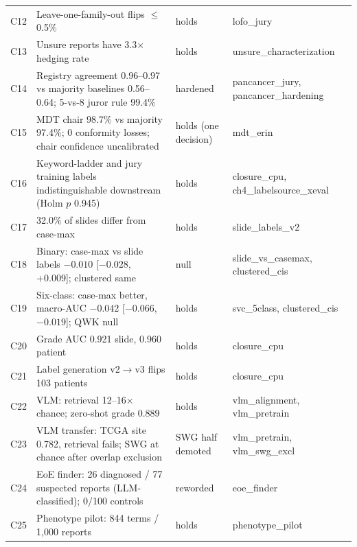 \begin{small}
\begin{longtable}{@{}p{0.9cm}p{8.6cm}p{2.2cm}p{3.3cm}@{}}
C12 & Leave-one-family-out flips $\le$0.5\% & holds & lofo\_jury \\
C13 & Unsure reports have 3.3$\times$ hedging rate & holds & unsure\_characterization \\
C14 & Registry agreement 0.96--0.97 vs majority baselines 0.56--0.64; 5-vs-8 juror rule 99.4\% & hardened & pancancer\_jury, pancancer\_hardening \\
C15 & MDT chair 98.7\% vs majority 97.4\%; 0 conformity losses; chair confidence uncalibrated & holds (one decision) & mdt\_erin \\
C16 & Keyword-ladder and jury training labels indistinguishable downstream (Holm $p$ 0.945) & holds & closure\_cpu, ch4\_labelsource\_xeval \\
C17 & 32.0\% of slides differ from case-max & holds & slide\_labels\_v2 \\
C18 & Binary: case-max vs slide labels $-0.010$ [$-0.028$, +0.009]; clustered same & null & slide\_vs\_casemax, clustered\_cis \\
C19 & Six-class: case-max better, macro-AUC $-0.042$ [$-0.066$, $-0.019$]; QWK null & holds & svc\_5class, clustered\_cis \\
C20 & Grade AUC 0.921 slide, 0.960 patient & holds & closure\_cpu \\
C21 & Label generation v2$\to$v3 flips 103 patients & holds & closure\_cpu \\
C22 & VLM: retrieval 12--16$\times$ chance; zero-shot grade 0.889 & holds & vlm\_alignment, vlm\_pretrain \\
C23 & VLM transfer: TCGA site 0.782, retrieval fails; SWG at chance after overlap exclusion & SWG half demoted & vlm\_pretrain, vlm\_swg\_excl \\
C24 & EoE finder: 26 diagnosed / 77 suspected reports (LLM-classified); 0/100 controls & reworded & eoe\_finder \\
C25 & Phenotype pilot: 844 terms / 1,000 reports & holds & phenotype\_pilot \\
\bottomrule
\end{longtable}
\end{small}
